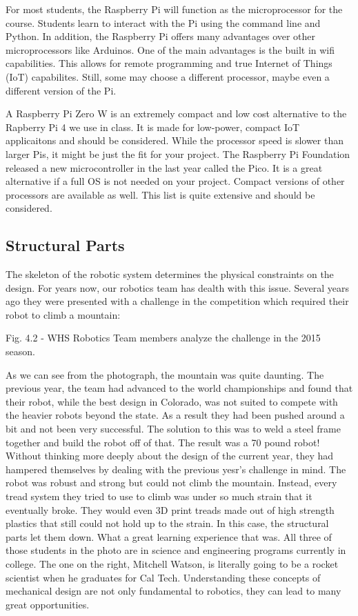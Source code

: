 \documentclass[
]{book}
\begin{document}
For most students, the Raspberry Pi will function as the microprocessor for the course. Students learn to interact with the Pi using the command line and Python. In addition, the Raspberry Pi offers many advantages over other microprocessors like Arduinos. One of the main advantages is the built in wifi capabilities. This allows for remote programming and true Internet of Things (IoT) capabilites. Still, some may choose a different processor, maybe even a different version of the Pi.

A Raspberry Pi Zero W is an extremely compact and low cost alternative to the Rapberry Pi 4 we use in class. It is made for low-power, compact IoT applicaitons and should be considered. While the processor speed is slower than larger Pis, it might be just the fit for your project. The Raspberry Pi Foundation released a new microcontroller in the last year called the Pico. It is a great alternative if a full OS is not needed on your project. Compact versions of other processors are available as well. This list is quite extensive and should be considered.

\hypertarget{structural-parts}{%
\subsection{Structural Parts}\label{structural-parts}}

The skeleton of the robotic system determines the physical constraints on the design. For years now, our robotics team has dealth with this issue. Several years ago they were presented with a challenge in the competition which required their robot to climb a mountain:

Fig. 4.2 - WHS Robotics Team members analyze the challenge in the 2015 season.

As we can see from the photograph, the mountain was quite daunting. The previous year, the team had advanced to the world championships and found that their robot, while the best design in Colorado, was not suited to compete with the heavier robots beyond the state. As a result they had been pushed around a bit and not been very successful. The solution to this was to weld a steel frame together and build the robot off of that. The result was a 70 pound robot! Without thinking more deeply about the design of the current year, they had hampered themselves by dealing with the previous yesr's challenge in mind. The robot was robust and strong but could not climb the mountain. Instead, every tread system they tried to use to climb was under so much strain that it eventually broke. They would even 3D print treads made out of high strength plastics that still could not hold up to the strain. In this case, the structural parts let them down. What a great learning experience that was. All three of those students in the photo are in science and engineering programs currently in college. The one on the right, Mitchell Watson, is literally going to be a rocket scientist when he graduates for Cal Tech. Understanding these concepts of mechanical design are not only fundamental to robotics, they can lead to many great opportunities.
\end{document}
